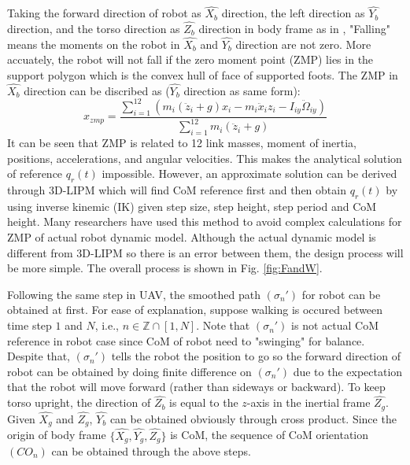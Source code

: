 \documentclass{ieeeaccess}
\begin{document}
Taking the forward direction of robot as $\widehat{X_b}$ direction, the left direction as $\widehat{Y_b}$ direction, and the torso direction as $\widehat{Z_b}$ direction in body frame as in \cite{ourrobot}, "Falling" means the moments on the robot in $\widehat{X_b}$ and $\widehat{Y_b}$ direction are not zero. More accuately, the robot will not fall if the zero moment point (ZMP) lies in the support polygon which is the convex hull of face of supported foots. The ZMP in $\widehat{X_b}$ direction can be discribed as \cite{huang2001planning} ($\widehat{Y_b}$ direction as same form):
\begin{equation}
    x_{zmp} = \frac{\sum_{i=1}^{12} (m_i(\ddot{z}_i+g)x_i - m_i\ddot{x}_iz_i - I_{iy}\ddot{\Omega}_{iy})}
                   {\sum_{i=1}^{12} m_i(\ddot{z}_i+g)}
\end{equation}
It can be seen that ZMP is related to 12 link masses, moment of inertia, positions, accelerations, and angular velocities. This makes the analytical solution of reference $q_r(t)$ impossible. However, an approximate solution can be derived through 3D-LIPM which will find CoM reference first and then obtain $q_r(t)$ by using inverse kinemic (IK) given step size, step height, step period and CoM height. Many researchers have used this method to avoid complex calculations for ZMP of actual robot dynamic model. Although the actual dynamic model is different from 3D-LIPM so there is an error between them, the design process will be more simple. The overall process is shown in Fig. \ref{fig:FandW}.

Following the same step in UAV, the smoothed path $(\sigma_n')$ for robot can be obtained at first. For ease of explanation, suppose walking is occured between time step $1$ and $N$, i.e., $n\in\mathbb{Z}\cap[1,N]$. Note that $(\sigma_n')$ is not actual CoM reference in robot case since CoM of robot need to "swinging" for balance. Despite that, $(\sigma_n')$ tells the robot the position to go so the forward direction of robot can be obtained by doing finite difference on $(\sigma_n')$ due to the expectation that the robot will move forward (rather than sideways or backward). To keep torso upright, the direction of $\widehat{Z_b}$ is equal to the $z$-axis in the inertial frame $\widehat{Z_g}$. Given $\widehat{X_g}$ and $\widehat{Z_g}$, $\widehat{Y_b}$ can be obtained obviously through cross product. Since the origin of body frame $\{ \widehat{X_g}, \widehat{Y_g}, \widehat{Z_g} \}$ is CoM, the sequence of CoM orientation $(CO_n)$ can be obtained through the above steps.
\end{document}
